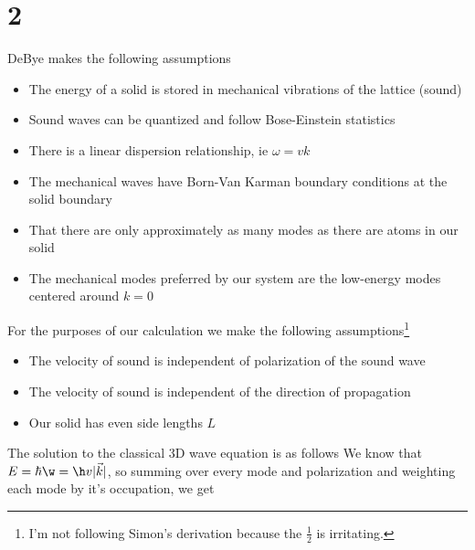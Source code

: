 \section*{2}
DeBye makes the following assumptions
\begin{itemize}
    \item The energy of a solid is stored in mechanical vibrations of the lattice (sound)
    \item Sound waves can be quantized and follow Bose-Einstein statistics
    \item There is a linear dispersion relationship, ie $\omega = vk$
    \item The mechanical waves have Born-Van Karman boundary conditions at the solid boundary
    \item That there are only approximately as many modes as there are atoms in our solid
    \item The mechanical modes preferred by our system are the low-energy modes centered around $k=0$
\end{itemize}
For the purposes of our calculation we make the following assumptions\footnote{I'm not following Simon's derivation because the $\frac{1}{2}$ is irritating.}
\begin{itemize}
    \item The velocity of sound is independent of polarization of the sound wave
    \item The velocity of sound is independent of the direction of propagation
    \item Our solid has even side lengths $L$
\end{itemize}
The solution to the classical 3D wave equation is as follows
We know that $E=\hbar \w = \h v |\vec{k}|$, so summing over every mode and polarization and weighting each mode by it's occupation, we get

